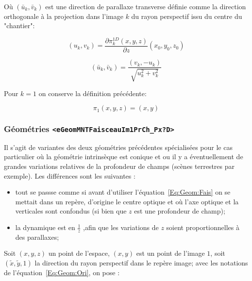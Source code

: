 O\`u $(\bar u_k,\bar v_k)$ est une direction de parallaxe transverse d\'efinie comme
la direction orthogonale \`a la projection dans l'image $k$ du rayon perspectif
issu du centre du "chantier":

\begin{equation}
    (u_k,v_k) = \frac{\partial \pi^{1D}_k(x,y,z)}{\partial z}(x_0,y_0,z_0)
\end{equation}

\begin{equation}
    (\bar u_k,\bar v_k) = \frac{(v_k,-u_k)}{\sqrt{ u^2_k+v^2_k}}
\end{equation}


Pour $k=1$ on conserve la d\'efinition pr\'ec\'edente:

\begin{equation}
   \pi_1(x,y,z) = (x,y)
\end{equation}


\subsubsection{G\'eom\'etries {\tt   <eGeomMNTFaisceauIm1PrCh\_Px?D> } }

Il s'agit de variantes des deux g\'eom\'etries pr\'ec\'edentes 
sp\'ecialis\'ees pour le cas particulier o\`u la g\'eom\'etrie intrins\`eque
est conique et ou il y a \'eventuellement de grandes variations relatives
de la profondeur de champs (sc\`enes terrestres par exemple).  
 Les diff\'erences sont les suivantes :


\begin{itemize}
   \item tout se passse comme si avant d'utiliser l'\'equation~\ref{Eq:Geom:Fais} 
         on se mettait dans un rep\`ere, d'origine le centre optique et 
         o\`u l'axe optique et la verticales
         sont confondus (si bien que $z$ est une profondeur de champ);

    \item la dynamique est en $\frac1z$ ,afin que les variations de  $z$ soient 
          proportionnelles \`a des  parallaxes;
\end{itemize}


Soit $(x,y,z)$ un point de l'espace, $(x,y)$ est un point de l'image $1$,
soit $(\tilde{x},\tilde{y},1)$  la direction du rayon perspectif dans le
rep\`ere image; 
avec les notations de l'\'equation~\ref{Eq:Geom:Ori},
on pose :


